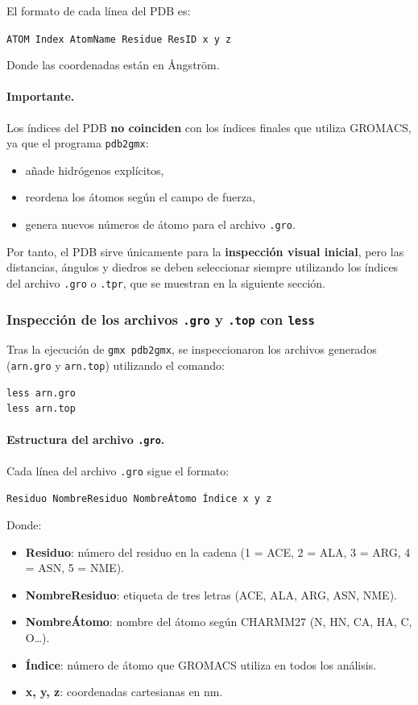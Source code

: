 \documentclass[12pt,a4paper]{article}
\begin{document}
El formato de cada línea del PDB es:

\begin{center}
\texttt{ATOM  Index  AtomName  Residue  ResID   x   y   z}
\end{center}

Donde las coordenadas están en Ångström.

\paragraph*{Importante.}
Los índices del PDB \textbf{no coinciden} con los índices finales que utiliza GROMACS,
ya que el programa \texttt{pdb2gmx}:
\begin{itemize}
  \item añade hidrógenos explícitos,
  \item reordena los átomos según el campo de fuerza,
  \item genera nuevos números de átomo para el archivo \texttt{.gro}.
\end{itemize}

Por tanto, el PDB sirve únicamente para la \textbf{inspección visual inicial},
pero las distancias, ángulos y diedros se deben seleccionar siempre utilizando
los índices del archivo \texttt{.gro} o \texttt{.tpr}, que se muestran en la siguiente sección.

\subsubsection*{Inspección de los archivos \texttt{.gro} y \texttt{.top} con \texttt{less}}

Tras la ejecución de \texttt{gmx pdb2gmx}, se inspeccionaron los archivos generados 
(\texttt{arn.gro} y \texttt{arn.top}) utilizando el comando:

\begin{verbatim}
less arn.gro
less arn.top
\end{verbatim}

\paragraph{Estructura del archivo \texttt{.gro}.}
Cada línea del archivo \texttt{.gro} sigue el formato:

\begin{center}
\texttt{Residuo  NombreResiduo  NombreÁtomo  Índice  x  y  z}
\end{center}

Donde:
\begin{itemize}
  \item \textbf{Residuo}: número del residuo en la cadena (1 = ACE, 2 = ALA, 3 = ARG, 4 = ASN, 5 = NME).
  \item \textbf{NombreResiduo}: etiqueta de tres letras (ACE, ALA, ARG, ASN, NME).
  \item \textbf{NombreÁtomo}: nombre del átomo según CHARMM27 (N, HN, CA, HA, C, O…).
  \item \textbf{Índice}: número de átomo que GROMACS utiliza en todos los análisis.
  \item \textbf{x, y, z}: coordenadas cartesianas en nm.
\end{itemize}
\end{document}
